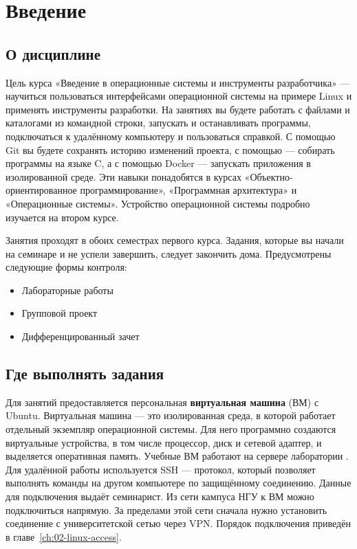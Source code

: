 \chapter{Введение}
\label{ch:01-intro}

\section{О дисциплине}

Цель курса «Введение в операционные системы и инструменты разработчика» ---
научиться пользоваться интерфейсами операционной системы на примере Linux
и применять инструменты разработки. На занятиях вы будете работать с файлами
и каталогами из командной строки, запускать и останавливать программы,
подключаться к удалённому компьютеру и пользоваться справкой. С помощью
Git вы будете сохранять историю изменений проекта, с помощью  ---
собирать программы на языке C, а с помощью Docker --- запускать приложения
в изолированной среде.
Эти навыки понадобятся в курсах «Объектно-ориентированное
программирование», «Программная архитектура» и «Операционные системы».
Устройство операционной системы подробно изучается на втором курсе.

Занятия проходят в обоих семестрах первого курса. Задания, которые вы
начали на семинаре и не успели завершить, следует закончить дома.
Предусмотрены следующие формы контроля:
\begin{itemize}
  \item Лабораторные работы
  \item Групповой проект
  \item Дифференцированный зачет
\end{itemize}

\section{Где выполнять задания}

Для занятий предоставляется персональная \textbf{виртуальная
машина} (ВМ) с Ubuntu. Виртуальная машина --- это изолированная среда,
в которой работает отдельный экземпляр операционной системы. Для него
программно создаются виртуальные устройства, в том числе процессор, диск
и сетевой адаптер, и выделяется оперативная память.
Учебные ВМ работают на сервере лаборатории
. Для удалённой работы используется SSH --- протокол,
который позволяет выполнять команды на другом компьютере по защищённому
соединению. Данные для подключения выдаёт семинарист.
Из сети кампуса НГУ к ВМ можно подключиться напрямую. За пределами этой
сети сначала нужно установить соединение с университетской сетью через
VPN. Порядок подключения приведён в главе~\ref{ch:02-linux-access}.

